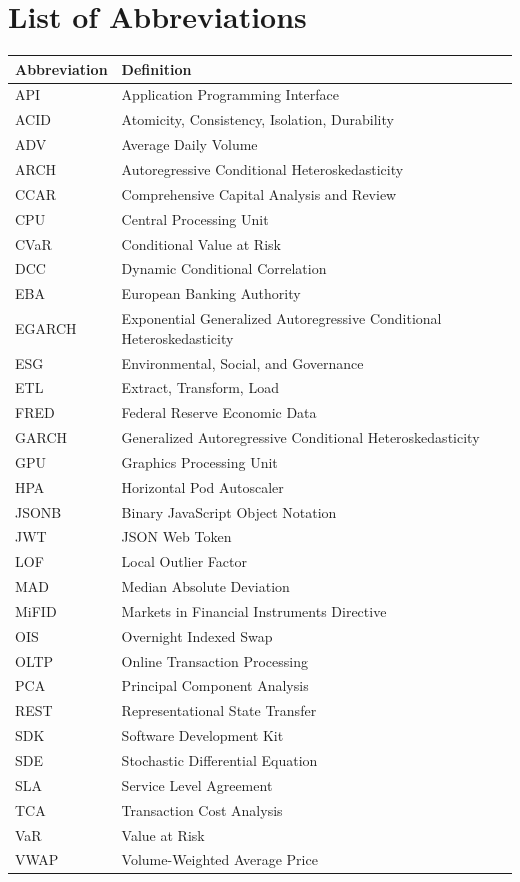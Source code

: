 \documentclass[12pt,a4paper]{article}
\theoremstyle{definition}
\theoremstyle{remark}
\begin{document}
\section*{List of Abbreviations}
\begin{longtable}{p{}p{}}
\textbf{Abbreviation} & \textbf{Definition} \\
\hline
API & Application Programming Interface \\
ACID & Atomicity, Consistency, Isolation, Durability \\
ADV & Average Daily Volume \\
ARCH & Autoregressive Conditional Heteroskedasticity \\
CCAR & Comprehensive Capital Analysis and Review \\
CPU & Central Processing Unit \\
CVaR & Conditional Value at Risk \\
DCC & Dynamic Conditional Correlation \\
EBA & European Banking Authority \\
EGARCH & Exponential Generalized Autoregressive Conditional Heteroskedasticity \\
ESG & Environmental, Social, and Governance \\
ETL & Extract, Transform, Load \\
FRED & Federal Reserve Economic Data \\
GARCH & Generalized Autoregressive Conditional Heteroskedasticity \\
GPU & Graphics Processing Unit \\
HPA & Horizontal Pod Autoscaler \\
JSONB & Binary JavaScript Object Notation \\
JWT & JSON Web Token \\
LOF & Local Outlier Factor \\
MAD & Median Absolute Deviation \\
MiFID & Markets in Financial Instruments Directive \\
OIS & Overnight Indexed Swap \\
OLTP & Online Transaction Processing \\
PCA & Principal Component Analysis \\
REST & Representational State Transfer \\
SDK & Software Development Kit \\
SDE & Stochastic Differential Equation \\
SLA & Service Level Agreement \\
TCA & Transaction Cost Analysis \\
VaR & Value at Risk \\
VWAP & Volume-Weighted Average Price \\
\end{longtable}
\end{document}
